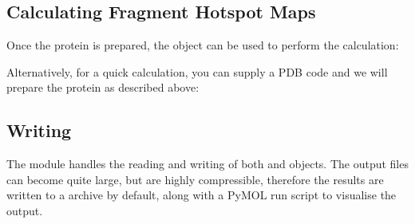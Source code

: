 \documentclass[letterpaper,10pt,english]{sphinxmanual}
\begin{document}
\subsection{Calculating Fragment Hotspot Maps}
\label{\detokenize{tutorial:calculating-fragment-hotspot-maps}}
Once the protein is prepared, the {\hyperref[\detokenize{calculation_api:hotspots.calculation.Runner}]{}} object can be used to perform the calculation:

\begin{sphinxVerbatim}[commandchars=\\\{\}]
   

  
  
\end{sphinxVerbatim}

Alternatively, for a quick calculation, you can supply a PDB code and we will prepare the protein as described above:

\begin{sphinxVerbatim}[commandchars=\\\{\}]
  
  
\end{sphinxVerbatim}


\subsection{Writing}
\label{\detokenize{tutorial:writing}}
The {\hyperref[\detokenize{hs_io_api:module-hotspots.hs_io}]{}} module handles the reading and writing of both 
and  objects. The output  files can become quite large, but are highly
compressible, therefore the results are written to a  archive by default, along with a PyMOL run script to
visualise the output.
\end{document}
